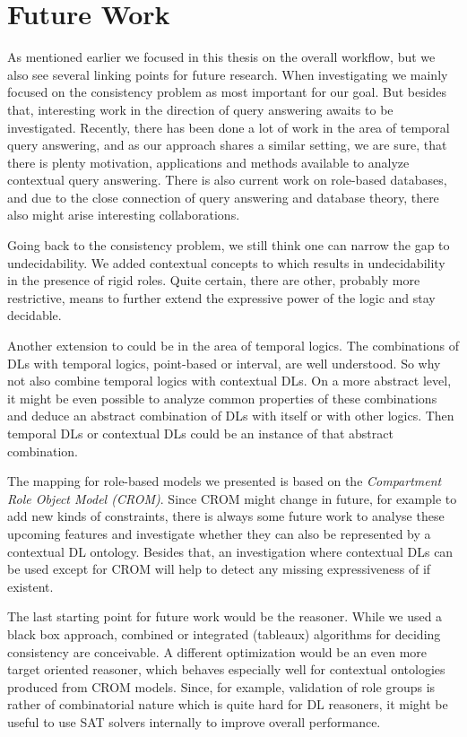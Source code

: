 \section{Future Work}
\label{sec:future-work}

As mentioned earlier we focused in this thesis on the overall workflow, but we also see several
linking points for future research. When investigating \LMLO we mainly focused on the consistency
problem as most important for our goal. But besides that, interesting work in the direction of query
answering awaits to be investigated. Recently, there has been done a lot of work in the area of
temporal query answering, and as our approach shares a similar setting, we are sure, that there is
plenty motivation, applications and methods available to analyze contextual query answering. There
is also current work on role-based databases, and due to the close connection of query answering and
database theory, there also might arise interesting collaborations.

Going back to the consistency problem, we still think one can narrow the gap to undecidability. We
added contextual concepts to \LMLO which results in undecidability in the presence of rigid
roles. Quite certain, there are other, probably more restrictive, means to further extend the
expressive power of the logic and stay decidable.

Another extension to \LMLO could be in the area of temporal logics. The combinations of DLs with
temporal logics, point-based or interval, are well understood. So why not also combine temporal
logics with contextual DLs. On a more abstract level, it might be even possible to analyze common
properties of these combinations and deduce an abstract combination of DLs with itself or with other
logics. Then temporal DLs or contextual DLs could be an instance of that abstract combination.

The mapping for role-based models we presented is based on the \emph{Compartment Role Object Model
  (CROM)}. Since CROM might change in future, for example to add new kinds of constraints, there is
always some future work to analyse these upcoming features and investigate whether they can also be
represented by a contextual DL ontology.  Besides that, an investigation where contextual DLs can be
used except for CROM will help to detect any missing expressiveness of \LMLO if existent.

The last starting point for future work would be the reasoner. While we used a black box approach,
combined or integrated (tableaux) algorithms for deciding consistency are conceivable. A different
optimization would be an even more target oriented reasoner, which behaves especially well for
contextual ontologies produced from CROM models. Since, for example, validation of role groups is
rather of combinatorial nature which is quite hard for DL reasoners, it might be useful to use SAT
solvers internally to improve overall performance.





